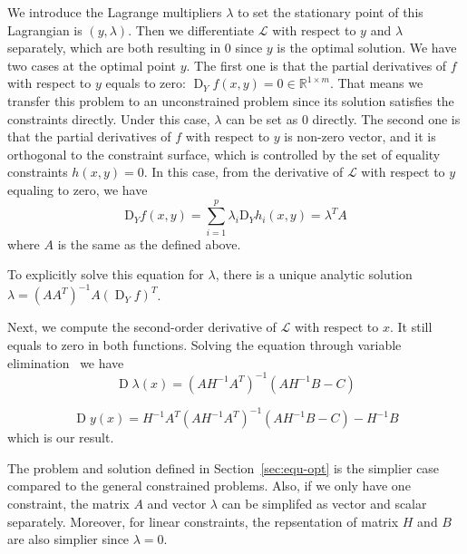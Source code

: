 \par We introduce the Lagrange multipliers $\lambda$ to set the stationary point of this Lagrangian is $(y, \lambda)$. Then we differentiate $\mathcal{L}$ with respect to $y$ and $\lambda$ separately, which are both resulting in 0 since $y$ is the optimal solution. We have two cases at the optimal point $y$. The first one is that the partial derivatives of $f$ with respect to $y$ equals to zero: $\operatorname{D}_Yf(x,y) = 0 \in \mathbb{R}^{1 \times m}$. That means we transfer this problem to an unconstrained problem since its solution satisfies the constraints directly. Under this case, $\lambda$ can be set as 0 directly. The second one is that the partial derivatives of $f$ with respect to $y$ is non-zero vector, and it is orthogonal to the constraint surface, which is controlled by the set of equality constraints $h(x, y) = 0$. In this case, from the derivative of $\mathcal{L}$ with respect to $y$ equaling to zero, we have
\begin{equation}
    \mathrm{D}_{Y} f(x, y)=\sum_{i=1}^{p} \lambda_{i} \mathrm{D}_{Y} h_{i}(x, y)=\lambda^{T} A
\end{equation}
where $A$ is the same as the defined above. 
\par To explicitly solve this equation for $\lambda$, there is a unique analytic solution $\lambda = (AA^T)^{-1}A(\operatorname{D}_Yf)^T$. 

\par Next, we compute the second-order derivative of $\mathcal{L}$ with respect to $x$. It still equals to zero in both functions. Solving the equation through variable elimination~\citep{BS:04} we have
\begin{equation}
    \operatorname{D} \lambda(x)=\left(A H^{-1} A^{T}\right)^{-1}\left(A H^{-1} B-C\right)
\end{equation}

\begin{equation}
    \label{equ:solution-eq}
    \operatorname{D} y(x)=H^{-1} A^{T}\left(A H^{-1} A^{T}\right)^{-1}\left(A H^{-1} B-C\right)-H^{-1} B
\end{equation}
which is our result. 
\par The problem and solution defined in Section~\ref{sec:equ-opt} is the simplier case compared to the general constrained problems. Also, if we only have one constraint, the matrix $A$ and vector $\lambda$ can be simplifed as vector and scalar separately. Moreover, for linear constraints, the repsentation of matrix $H$ and $B$ are also simplier since $\lambda = 0$.  

